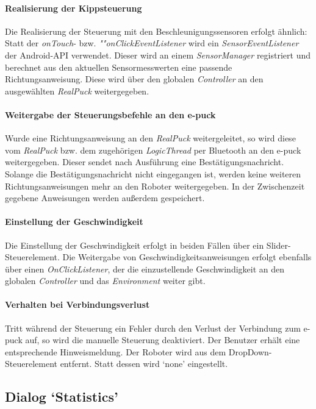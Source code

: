 \documentclass[10pt,a4paper]{article}
\begin{document}
	\paragraph*{Realisierung der Kippsteuerung} Die Realisierung der Steuerung mit den Beschleunigungssensoren erfolgt ähnlich: Statt der 
	\textit{onTouch}- bzw. \textit{""on\-Click\-E\-vent\-List\-e\-ner} wird ein \textit{SensorEventListener} der Android-API verwendet. Dieser wird
	an einem \textit{SensorManager} registriert und berechnet aus den aktuellen Sensormesswerten eine passende Richtungsanweisung. Diese wird über
	den globalen \textit{Controller} an den ausgewählten \textit{RealPuck} weitergegeben.
	
	\paragraph*{Weitergabe der Steuerungsbefehle an den e-puck} Wurde eine Richtungsanweisung an den \textit{RealPuck} weitergeleitet, so wird diese vom
	\textit{RealPuck} bzw. dem zugehörigen \textit{LogicThread} per Bluetooth an den e-puck weitergegeben. Dieser sendet nach Ausführung eine
	Bestätigungsnachricht.
	Solange die Bestätigungsnachricht nicht eingegangen ist, werden keine weiteren Richtungsanweisungen mehr an den Roboter weitergegeben. In der 
	Zwischenzeit gegebene Anweisungen werden außerdem gespeichert.
	
	\paragraph*{Einstellung der Geschwindigkeit} Die Einstellung der Geschwindigkeit erfolgt in beiden Fällen über ein Slider-Steuerelement. Die
	Weitergabe von Geschwindigkeitsanweisungen erfolgt ebenfalls über einen \textit{OnClickListener}, der die einzustellende Geschwindigkeit an den
	globalen \textit{Controller} und das \textit{Environment} weiter gibt.
	
	\paragraph*{Verhalten bei Verbindungsverlust} Tritt während der Steuerung ein Fehler durch den Verlust der Verbindung zum e-puck auf, so wird die
	manuelle Steuerung deaktiviert. Der Benutzer erhält eine entsprechende Hinweismeldung. Der Roboter wird aus dem DropDown-Steuerelement entfernt.
	Statt dessen wird `none' eingestellt.
		
	\subsection*{Dialog `Statistics'}
	
\end{document}
